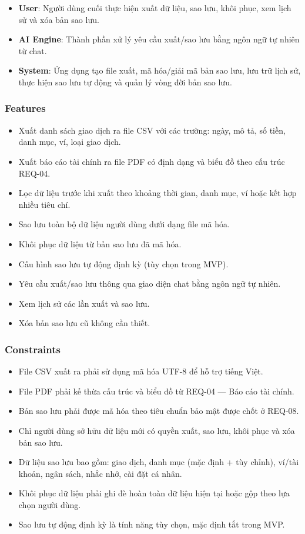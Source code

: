 \begin{itemize}
\item \textbf{User}: Người dùng cuối thực hiện xuất dữ liệu, sao lưu, khôi phục, xem lịch sử và xóa bản sao lưu.
\item \textbf{AI Engine}: Thành phần xử lý yêu cầu xuất/sao lưu bằng ngôn ngữ tự nhiên từ chat.
\item \textbf{System}: Ứng dụng tạo file xuất, mã hóa/giải mã bản sao lưu, lưu trữ lịch sử, thực hiện sao lưu tự động và quản lý vòng đời bản sao lưu.
\end{itemize}
\subsubsection{Features}

\begin{itemize}
\item Xuất danh sách giao dịch ra file CSV với các trường: ngày, mô tả, số tiền, danh mục, ví, loại giao dịch.
\item Xuất báo cáo tài chính ra file PDF có định dạng và biểu đồ theo cấu trúc REQ-04.
\item Lọc dữ liệu trước khi xuất theo khoảng thời gian, danh mục, ví hoặc kết hợp nhiều tiêu chí.
\item Sao lưu toàn bộ dữ liệu người dùng dưới dạng file mã hóa.
\item Khôi phục dữ liệu từ bản sao lưu đã mã hóa.
\item Cấu hình sao lưu tự động định kỳ (tùy chọn trong MVP).
\item Yêu cầu xuất/sao lưu thông qua giao diện chat bằng ngôn ngữ tự nhiên.
\item Xem lịch sử các lần xuất và sao lưu.
\item Xóa bản sao lưu cũ không cần thiết.
\end{itemize}
\subsubsection{Constraints}

\begin{itemize}
\item File CSV xuất ra phải sử dụng mã hóa UTF-8 để hỗ trợ tiếng Việt.
\item File PDF phải kế thừa cấu trúc và biểu đồ từ REQ-04 — Báo cáo tài chính.
\item Bản sao lưu phải được mã hóa theo tiêu chuẩn bảo mật được chốt ở REQ-08.
\item Chỉ người dùng sở hữu dữ liệu mới có quyền xuất, sao lưu, khôi phục và xóa bản sao lưu.
\item Dữ liệu sao lưu bao gồm: giao dịch, danh mục (mặc định + tùy chỉnh), ví/tài khoản, ngân sách, nhắc nhở, cài đặt cá nhân.
\item Khôi phục dữ liệu phải ghi đè hoàn toàn dữ liệu hiện tại hoặc gộp theo lựa chọn người dùng.
\item Sao lưu tự động định kỳ là tính năng tùy chọn, mặc định tắt trong MVP.
\end{itemize}
